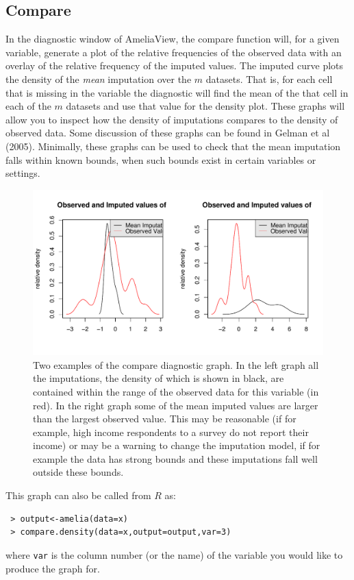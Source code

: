 \documentclass[12pt,titlepage]{article}
\begin{document}
\subsection{Compare}
In the diagnostic window of AmeliaView, the compare function will, for
a given variable, generate a plot of the relative frequencies of the
observed data with an overlay of the relative frequency of the imputed
values.  The imputed curve plots the density of the \emph{mean}
imputation over the $m$ datasets.  That is, for each cell that is
missing in the variable the diagnostic will find the mean of the that
cell in each of the $m$ datasets and use that value for the density
plot.  These graphs will allow you to inspect how the density of
imputations compares to the density of observed data. Some discussion
of these graphs can be found in Gelman et al (2005).  Minimally, these
graphs can be used to check that the mean imputation falls within
known bounds, when such bounds exist in certain variables or settings.
\begin{figure}[htp!]
  \centering \includegraphics[scale=.8]{comp}
  \caption{ Two examples of the compare diagnostic graph.  In the left
    graph all the imputations, the density of which is shown in black,
    are contained within the range of the observed data for this
    variable (in red).  In the right graph some of the mean imputed
    values are larger than the largest observed value.  This may be
    reasonable (if for example, high income respondents to a survey do
    not report their income) or may be a warning to change the
    imputation model, if for example the data has strong bounds and
    these imputations fall well outside these bounds.}
  \label{f:oi1}
\end{figure}


This graph can also be called from $R$ as:
\begin{verbatim}
 > output<-amelia(data=x) 
 > compare.density(data=x,output=output,var=3)
\end{verbatim}
where \texttt{var} is the column number (or the name) of the variable
you would like to produce the graph for.
\end{document}
